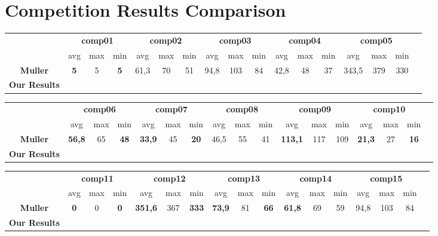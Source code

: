 \section{Competition Results Comparison}

\begin{table}[h!]
\centering
\footnotesize
\begin{tabular}{ccccccccccccccccc}
\hline
& \multicolumn{3}{c}{\textbf{comp01}} & \multicolumn{3}{c}{\textbf{comp02}} & \multicolumn{3}{c}{\textbf{comp03}} & \multicolumn{3}{c}{\textbf{comp04}} & \multicolumn{3}{c}{\textbf{comp05}} \\
& avg & max & min & avg & max & min & avg & max & min & avg & max & min & avg & max & min \\
\textbf{Muller} & \textbf{5} & 5 & \textbf{5} & 61,3 & 70 & 51 & 94,8 & 103 & 84 & 42,8 & 48 & 37 & 343,5 & 379 & 330 \\
\textbf{Our Results} & & & & & & & & & & & & & & & \\
\end{tabular}

\centering
\footnotesize
\begin{tabular}{ccccccccccccccccc}
\hline
& \multicolumn{3}{c}{\textbf{comp06}} & \multicolumn{3}{c}{\textbf{comp07}} & \multicolumn{3}{c}{\textbf{comp08}} & \multicolumn{3}{c}{\textbf{comp09}} & \multicolumn{3}{c}{\textbf{comp10}} \\
& avg & max & min & avg & max & min & avg & max & min & avg & max & min & avg & max & min \\
\textbf{Muller} & \textbf{56,8} & 65 & \textbf{48} & \textbf{33,9} & 45 & \textbf{20} & 46,5 & 55 & 41 & \textbf{113,1} & 117 & 109 & \textbf{21,3} & 27 & \textbf{16} \\
\textbf{Our Results} & & & & & & & & & & & & & & & \\
\end{tabular}

\centering
\footnotesize
\begin{tabular}{ccccccccccccccccc}
\hline
& \multicolumn{3}{c}{\textbf{comp11}} & \multicolumn{3}{c}{\textbf{comp12}} & \multicolumn{3}{c}{\textbf{comp13}} & \multicolumn{3}{c}{\textbf{comp14}} & \multicolumn{3}{c}{\textbf{comp15}} \\
& avg & max & min & avg & max & min & avg & max & min & avg & max & min & avg & max & min \\
\textbf{Muller} & \textbf{0} & 0 & \textbf{0} & \textbf{351,6} & 367 & \textbf{333} & \textbf{73,9} & 81 & \textbf{66} & \textbf{61,8} & 69 & 59 & 94,8 & 103 & 84 \\
\textbf{Our Results} & & & & & & & & & & & & & & & \\
\end{tabular}


\end{table}

